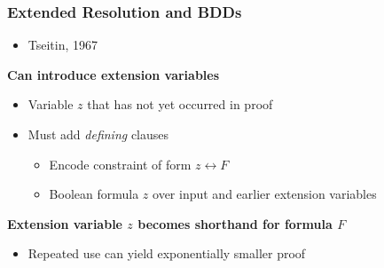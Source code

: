 \documentclass[t,pdf]{beamer}
\begin{document}
\begin{frame}
  \frametitle{Extended Resolution and BDDs}
  
\begin{itemize}
\item Tseitin, 1967
\end{itemize}

{\bf Can introduce extension variables}
\begin{itemize}
\item Variable $z$ that has not yet occurred in proof
\item Must add {\em defining} clauses
\begin{itemize}
\item Encode constraint of form $z \leftrightarrow F$
\item Boolean formula $z$ over input and earlier extension variables
\end{itemize}
\end{itemize}

\medskip

{\bf Extension variable $z$ becomes shorthand for formula $F$}
  \begin{itemize}
  \item Repeated use can yield exponentially smaller proof
  \end{itemize}

  \medskip
{}
\end{frame}
\end{document}
